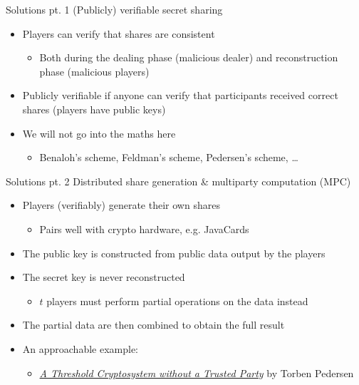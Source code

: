 \begin{frame}{Solutions pt. 1}
  (Publicly) verifiable secret sharing
  \begin{itemize}[<+(1)->]
    \item Players can verify that shares are consistent
    \begin{itemize}
      \item Both during the dealing phase (malicious dealer) and reconstruction phase (malicious players)
    \end{itemize}
    \item Publicly verifiable if anyone can verify that participants received correct shares (players have public keys)
    \item We will not go into the maths here
    \begin{itemize}
      \item Benaloh's scheme, Feldman's scheme, Pedersen's scheme, \dots
    \end{itemize}
  \end{itemize}
\end{frame}

\begin{frame}{Solutions pt. 2}
  Distributed share generation \& multiparty computation (MPC)
  \begin{itemize}[<+(1)->]
    \item Players (verifiably) generate their own shares
    \begin{itemize}
      \item Pairs well with crypto hardware, e.g. JavaCards
    \end{itemize}
    \item The public key is constructed from public data output by the players
    \item The secret key is never reconstructed
    \begin{itemize}
      \item $t$ players must perform partial operations on the data instead
    \end{itemize}
    \item The partial data are then combined to obtain the full result
    \item An approachable example:
    \begin{itemize}
      \item \href{https://link.springer.com/chapter/10.1007/3-540-46416-6_47}{\textit{A Threshold Cryptosystem without a Trusted Party}} by Torben Pedersen
    \end{itemize}
  \end{itemize}
\end{frame}

